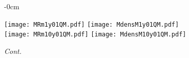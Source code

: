 \documentclass[universe,article,accept,moreauthors,pdftex]{Definitions/mdpi}
\begin{document}
\begin{figure}[H]

\begin{adjustwidth}{-\extralength}{0cm}
\centering %

{\texttt{[image: MRm1y01QM.pdf]}\hspace{3pt}
	  \texttt{[image: MdensM1y01QM.pdf]}}\\
{\texttt{[image: MRm10y01QM.pdf]}\hspace{3pt}
	  \texttt{[image: MdensM10y01QM.pdf]}}\\
\end{adjustwidth}
\caption{\emph{Cont.}}
\label{fig:MRdens01QM}

\end{figure}
\end{document}
